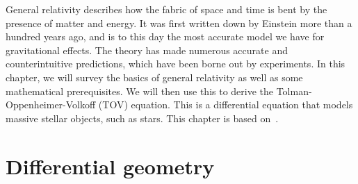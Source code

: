 General relativity describes how the fabric of space and time is bent by the presence of matter and energy.
It was first written down by Einstein more than a hundred years ago, and is to this day the most accurate model we have for gravitational effects.
The theory has made numerous accurate and counterintuitive predictions, which have been borne out by experiments.
In this chapter, we will survey the basics of general relativity as well as some mathematical prerequisites.
We will then use this to derive the Tolman-Oppenheimer-Volkoff (TOV) equation.
This is a differential equation that models massive stellar objects, such as stars. 
This chapter is based on~\autocite{carrollSpacetimeGeometryIntroduction2019,leeSmoothManifolds2012}.

\section{Differential geometry}

